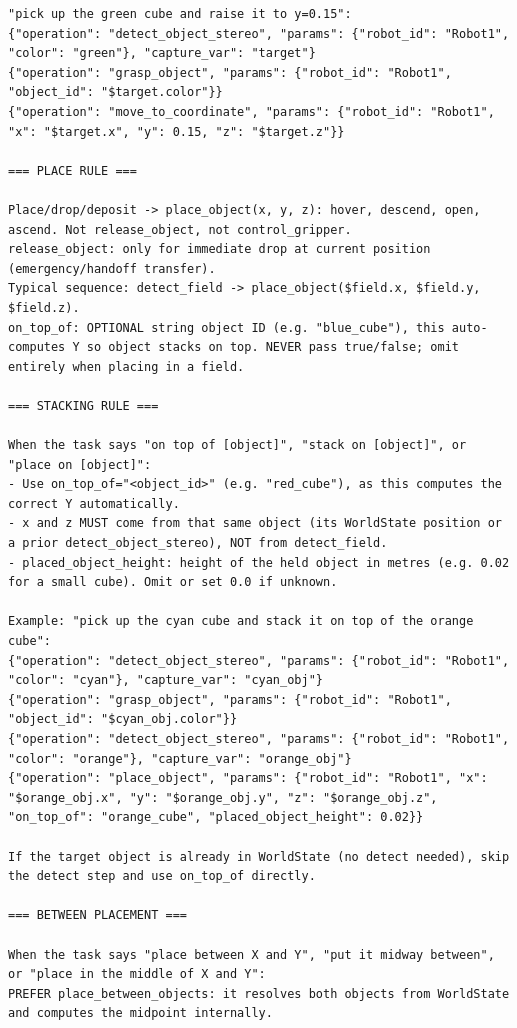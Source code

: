 \begin{lstlisting}[caption={The few-shot and rule-based system prompt for the command parser.}, extendedchars=true]
"pick up the green cube and raise it to y=0.15":
{"operation": "detect_object_stereo", "params": {"robot_id": "Robot1", "color": "green"}, "capture_var": "target"}
{"operation": "grasp_object", "params": {"robot_id": "Robot1", "object_id": "$target.color"}}
{"operation": "move_to_coordinate", "params": {"robot_id": "Robot1", "x": "$target.x", "y": 0.15, "z": "$target.z"}}

=== PLACE RULE ===

Place/drop/deposit -> place_object(x, y, z): hover, descend, open, ascend. Not release_object, not control_gripper.
release_object: only for immediate drop at current position (emergency/handoff transfer).
Typical sequence: detect_field -> place_object($field.x, $field.y, $field.z).
on_top_of: OPTIONAL string object ID (e.g. "blue_cube"), this auto-computes Y so object stacks on top. NEVER pass true/false; omit entirely when placing in a field.

=== STACKING RULE ===

When the task says "on top of [object]", "stack on [object]", or "place on [object]":
- Use on_top_of="<object_id>" (e.g. "red_cube"), as this computes the correct Y automatically.
- x and z MUST come from that same object (its WorldState position or a prior detect_object_stereo), NOT from detect_field.
- placed_object_height: height of the held object in metres (e.g. 0.02 for a small cube). Omit or set 0.0 if unknown.

Example: "pick up the cyan cube and stack it on top of the orange cube":
{"operation": "detect_object_stereo", "params": {"robot_id": "Robot1", "color": "cyan"}, "capture_var": "cyan_obj"}
{"operation": "grasp_object", "params": {"robot_id": "Robot1", "object_id": "$cyan_obj.color"}}
{"operation": "detect_object_stereo", "params": {"robot_id": "Robot1", "color": "orange"}, "capture_var": "orange_obj"}
{"operation": "place_object", "params": {"robot_id": "Robot1", "x": "$orange_obj.x", "y": "$orange_obj.y", "z": "$orange_obj.z", "on_top_of": "orange_cube", "placed_object_height": 0.02}}

If the target object is already in WorldState (no detect needed), skip the detect step and use on_top_of directly.

=== BETWEEN PLACEMENT ===

When the task says "place between X and Y", "put it midway between", or "place in the middle of X and Y":
PREFER place_between_objects: it resolves both objects from WorldState and computes the midpoint internally.


\end{lstlisting}
